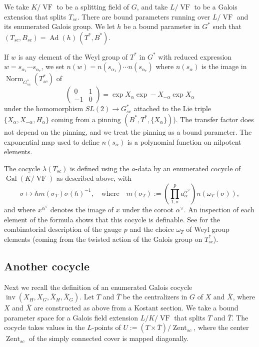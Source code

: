 \documentclass[12pt]{amsart}
\newcommand{\op}[1]{\operatorname{#1}}
\def\VF{{\op{VF}}}
\theoremstyle{plain}
\theoremstyle{definition}
\begin{document}
We take $K/\VF$ to be a splitting field of $G$, and take $L/\VF$ to be
a Galois extension that splits $T_{sc}$.  There are bound parameters
running over $L/\VF$ and its enumerated Galois group.  We let $h$ be a
bound parameter in $G^*$ such that $(T_{sc},B_{sc}) =
\op{Ad}(h)\,(T^*,B^*)$.

If $w$ is any element of the Weyl group of $T^*$ in $G^*$ with reduced
expression $w = s_{\alpha_1}\cdots s_{\alpha_r}$, we set $n(w) =
n(s_{\alpha_1})\cdots n(s_{\alpha_r})$ where
$n(s_\alpha)$ is the image
in $\op{Norm}_{G_{sc}^*}(T_{sc}^*)$ of
\[
\begin{pmatrix}0 &1\\ -1 & 0\end{pmatrix} = \op{exp} X_\alpha \op{exp} -
  X_{-\alpha} \op{exp} X_\alpha
\]
under the homomorphism $SL(2)\to G^*_{sc}$ attached to the Lie triple
$\{ X_\alpha,X_{-\alpha},H_\alpha \}$ coming from a pinning
$(B^*,T^*,\{X_\alpha\})$).  The transfer factor does not depend on the
pinning, and we treat the pinning as a bound parameter.  The
exponential map used to define $n(s_\alpha)$ is a polynomial function
on nilpotent elements.

The cocycle $\lambda(T_{sc})$ is defined using the $a$-data by an enumerated
cocycle of $\op{Gal}(K/\VF)$ as described above, with
\[
\sigma \mapsto h m(\sigma_T) \sigma(h)^{-1},\quad \text{where}\quad
m(\sigma_T):= \left( \prod_{1,\sigma}^p 
a_\alpha^{\alpha^\vee}\right) n(\omega_T(\sigma)),
\]
and where $x^{\alpha^\vee}$ denotes the image of $x$ under the coroot
$\alpha^\vee$.  An inspection of each element of the formula shows
that this cocycle is definable.  See \cite{LSxf} for the combinatorial
description of the gauge $p$ and the choice $\omega_T$ of Weyl group
elements (coming from the twisted action of the Galois group on
$T^*_{sc}$).

\subsection{Another cocycle}

Next we recall the definition of an enumerated Galois cocycle
$\op{inv}(X_H,X_G,\bar X_H,\bar X_G)$.  Let $T$ and $\bar T$ be the
centralizers in $G$ of $X$ and $\bar X$, where $X$ and $\bar X$ are
constructed as above from a Kostant section.  We take a bound
parameter space for a Galois field extension $L/K/\VF$ that splits $T$
and $\bar T$.  The cocycle takes values in the $L$-points of $U:=
(T\times \bar T)/\op{Zent}_{sc}$, where the center $\op{Zent}_{sc}$ of
the simply connected cover is mapped diagonally.
\end{document}
